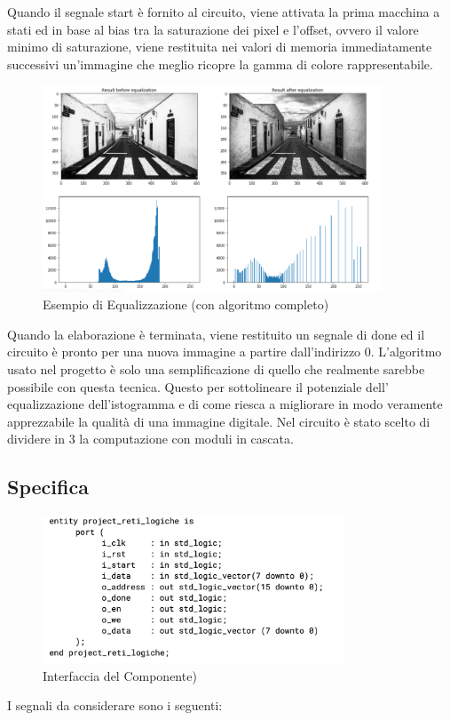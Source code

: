 \documentclass{article}
\begin{document}
Quando il segnale start è fornito al circuito, viene attivata la prima macchina a stati ed in base al bias tra la saturazione dei pixel e l'offset, ovvero il valore minimo di saturazione, viene restituita nei valori di memoria immediatamente successivi un'immagine che meglio ricopre la gamma di colore rappresentabile.
\begin{figure}[h]
\centering
\includegraphics[width=0.9\textwidth]{Example.png}
\caption{Esempio di Equalizzazione (con algoritmo completo)}
\end{figure}
Quando la elaborazione è terminata, viene restituito un segnale di done ed il circuito è pronto per una nuova immagine a partire dall'indirizzo 0. L'algoritmo usato nel progetto è solo una semplificazione di quello che realmente sarebbe possibile con questa tecnica. 
\newline
Questo per sottolineare il potenziale dell' equalizzazione dell'istogramma e di come riesca a migliorare in modo veramente apprezzabile la qualità di una immagine digitale.
\newline
\break
Nel circuito è stato scelto di dividere in 3 la computazione con moduli in cascata.
\subsection{Specifica}
 \begin{figure}[h]
\centering
\includegraphics[width=0.8\textwidth]{segnali.png}
\caption{Interfaccia del Componente)}
\end{figure}
I segnali da considerare sono i seguenti:
\newline
\end{document}
